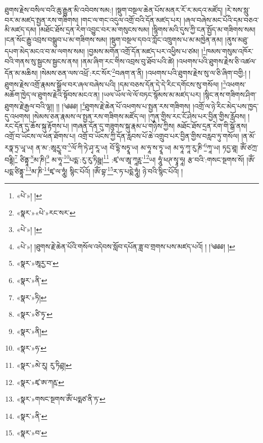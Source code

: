 ཐུགས་རྗེས་བསིལ་བའི་ཆུ་རྒྱུན་མི་འབེབས་སམ:། །སྡུག་བསྔལ་ཆེན་པོས་མནར་རོ་ར་མདའ་མཛོད། །རེ་སས་སླུ་བར་མ་མཛད་སྤྱན་རས་གཟིགས། །གང་ལ་གང་འདུལ་འགྲོ་བའི་དོན་མཛད་པར། །ཞལ་བཞེས་མང་པོའི་དམ་བཅའ་མི་མཛད་དམ། །མཐོང་ཐོས་དྲན་རེག་འབྱུང་བར་མ་གསུངས་སམ། །སྙིགས་མའི་དུས་ཀྱི་ངན་སྤྱོད་མ་གཟིགས་སམ། །ངན་སོང་རྒྱུ་འབྲས་བསྒྲུབ་པ་མ་གཟིགས་སམ། །སྡུག་བསྔལ་དབའ་ཀློང་འཁྲུགས་པ་མ་མཁྱེན་ནམ། །ནུས་མཐུ་དཔག་མེད་མངའ་བ་མ་ལགས་སམ། །བྱམས་མགོན་འགྲོ་དོན་མཛད་པར་འཕྱིས་པ་ཙམ། །\footnote{«པེ་»། །}ཁམས་གསུམ་འཁོར་བའི་གནས་སུ་སྦྱངས་སྦྱངས་ནས། །ནམ་ཞིག་རང་གིས་འབྲས་བུ་ཐོབ་པའི་ཚེ། །འཕགས་པའི་ཐུགས་རྗེས་ཅི་འཚལ་དོན་མ་མཆིས། །སེམས་ཅན་ལས་འཕྲོ་:རང་སོར་\footnote{«སྣར་»«པེ་»རང་སར་}བཞག་ན་ནི། །འཕགས་པའི་ཐུགས་རྗེས་སུ་ལ་ཅི་ཞིག་བགྱི:། །ཐུགས་རྗེས་འགྲོ་རྣམས་སྒྲོལ་བར་ཞལ་བཞེས་པའི། །དམ་བཅས་དོན་དེ་དེ་རིང་དགོངས་སུ་གསོལ། །\footnote{«པེ་»། །}འཕགས་མཆོག་ཁྱེད་ལ་ཐུགས་རྗེའི་སྟོབས་མངའ་ན། །ཡལ་ཡོལ་ལེ་ལོ་བཏང་སྙོམས་མ་མཛད་པར། །སྙིང་ནས་གཟིགས་ཤིག་ཐུགས་རྗེ་རྒྱལ་བའི་ལྷ།། །། །༄༅༅། །\footnote{«པེ་»། །ཐུགས་རྗེ་ཆེན་པོའི་གསོལ་འདེབས་སློབ་དཔོན་ཟླ་བ་གྲགས་པས་མཛད་པའོ། ། །༄༅༅། །}ཐུགས་རྗེ་ཆེན་པོ་འཕགས་པ་སྤྱན་རས་གཟིགས། །འགྲོ་ལ་ཉེ་རིང་མེད་པས་ཁྱད་དུ་འཕགས། །སེམས་ཅན་རྣམས་ལ་སྤྱན་རས་གཟིགས་མཛོད་ལ། །ཀུན་གྱིས་རང་ངོ་ཤེས་པར་བྱིན་གྱིས་རློབས། །རང་དོན་དུ་ཆོས་སྐུ་རྟོགས་པ། །གཞན་དོན་དུ་གཟུགས་སྐུ་རྣམ་པ་གཉིས་ཀྱིས། མཐོང་ཐོས་དྲན་རེག་གི་སྒོ་ནས། འགྲོ་བ་ཡོངས་ལ་ཕན་ཐོགས་པ། འགྲོ་བ་ཡོངས་ཀྱི་དོན་རླབས་པོ་ཆེ་འགྲུབ་པར་བྱིན་གྱིས་བརླབ་ཏུ་གསོལ། །ན་མོ་རཏྣ་ཏྲ་ཡཱ་ཡ། ན་མ་:ཨཱརྱཱ་བ་\footnote{«སྣར་»ཨཱརྱ་བ་}ལོ་ཀི་ཏེ་ཤྭ་རཱ་ཡ། བོ་དྷི་སཏྭཱ་ཡ། མ་ཧཱ་ས་ཏྭཱ་ཡ། མ་ཧཱ་ཀཱ་རུ་ཎི་\footnote{«སྣར་»ནི་}ཀཱ་ཡ། ཏདྱ་ཐཱ། ཨོཾ་ཙཀྲ་བརྟྟི།\footnote{«སྣར་»ཏི།} ཙིནྟཱ་\footnote{«སྣར་»ཙི་ཏྭ་}མ་ཎི།\footnote{«སྣར་»ནི།} མ་ཧཱ་\footnote{«སྣར་»ཧ་}པདྨ་:རུ་རུ་ཏིཥྛ།\footnote{«སྣར་»མེ་རུ། རུ་ཏིཤྟ།} :ཛྭ་ལ་ཨཱ་ཀཱཪྵ་\footnote{«སྣར་»ཛྭ་ཨ་ཀརྵ་}ཡ། ཧཱུཾ་ཕཊ་སྭཱ་ཧཱ། རྩ་བའི་:གསང་སྔགས་སོ། །ཨོཾ་པདྨ་ཙིནྟཱ་\footnote{«སྣར་»གསང་སྔགས་ཨོཾ་པདྨཙ་ནི་ཏ་}མ་ཎི་\footnote{«སྣར་»ནི་}ཛྭ་ལ་ཧཱུཾ། སྙིང་པོའོ། །ཨོཾ་བྷ་\footnote{«སྣར་»བ་}ར་ཏ་པདྨེ་ཧཱུཾ། ཉེ་བའི་སྙིང་པོའོ། ། 